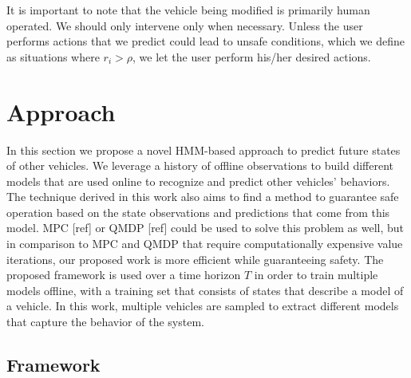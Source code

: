 \documentclass[conference]{IEEEtran}
\begin{document}
    It is important to note that the vehicle being modified is primarily human operated. We should only intervene only when necessary. Unless the user performs actions that we predict could lead to unsafe conditions, which we define as situations where $r_i>\rho$, we let the user perform his/her desired actions.

\section{Approach}

In this section we propose a novel HMM-based approach to predict future states of other vehicles. We leverage a history of offline observations to build different models that are used online to recognize and predict other vehicles' behaviors. The technique derived in this work also aims to find a method to guarantee safe operation based on the state observations and predictions that come from this model. MPC [ref] or QMDP [ref] could be used to solve this problem as well, but in comparison to MPC and QMDP that require computationally expensive value iterations, our proposed work is more efficient while guaranteeing safety. The proposed framework is used over a time horizon $T$ in order to train multiple models offline, with a training set that consists of states that describe a model of a vehicle. In this work, multiple vehicles are sampled to extract different models that capture the behavior of the system.

\subsection{Framework}
\end{document}
